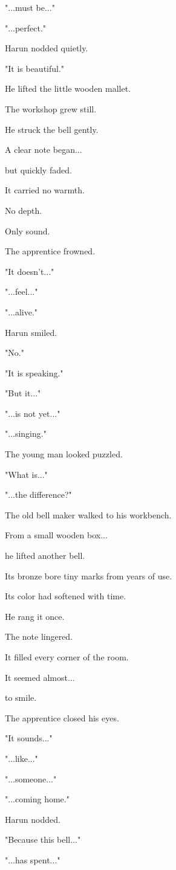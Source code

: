 \documentclass[12pt,openany]{book}
\begin{document}
"...must be..."

"...perfect."

Harun nodded quietly.

"It is beautiful."

He lifted the little wooden mallet.

The workshop grew still.

He struck the bell gently.

A clear note began...

but quickly faded.

It carried no warmth.

No depth.

Only sound.

The apprentice frowned.

"It doesn't..."

"...feel..."

"...alive."

Harun smiled.

"No."

"It is speaking."

"But it..."

"...is not yet..."

"...singing."

The young man looked puzzled.

"What is..."

"...the difference?"

The old bell maker walked to his workbench.

From a small wooden box...

he lifted another bell.

Its bronze bore tiny marks from years of use.

Its color had softened with time.

He rang it once.

The note lingered.

It filled every corner of the room.

It seemed almost...

to smile.

The apprentice closed his eyes.

"It sounds..."

"...like..."

"...someone..."

"...coming home."

Harun nodded.

"Because this bell..."

"...has spent..."
\end{document}

